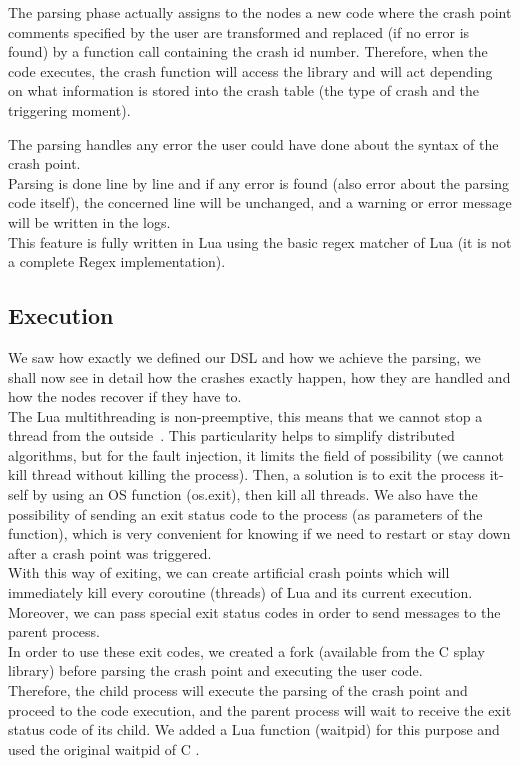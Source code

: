 \documentclass{eplmastersthesis}
\begin{document}
        The parsing phase actually assigns to the nodes a new code where the
        crash point comments specified by the user are transformed and
        replaced (if no error is found) by a function call containing the
        crash id number. Therefore, when the code executes, the crash
        function will access the library and will act depending on what
        information is stored into the crash table (the type of crash and 
        the triggering moment).

        The parsing handles any error the user could have done about the
        syntax of the crash point.\\
        Parsing is done line by line and if any error is found (also error
        about the parsing code itself), the concerned line will be unchanged, and
        a warning or error message will be written in the logs.\\
        This feature is fully written in Lua using the basic regex matcher of Lua
        \cite{RegexLua} (it is not a complete Regex implementation).

      \subsection{Execution}

        We saw how exactly we defined our DSL and how we achieve the parsing,
        we shall now see in detail how the crashes exactly happen, how they
        are handled and how the nodes recover if they have to.\\

        The Lua multithreading is non-preemptive, this means that we cannot stop a thread from the
        outside~\cite{CoroutineLua}. This particularity helps to simplify distributed algorithms,
        but for the fault injection, it limits the field of possibility 
        (we cannot kill thread without killing the process).
        Then, a solution is to exit the process it-self by using an OS function (os.exit),
        then kill all threads. We also have the possibility of sending an exit
        status code to the process (as parameters of the function),
        which is very convenient for knowing if we need to restart or stay 
        down after a crash point was triggered.\\

        With this way of exiting, we can create artificial crash points which
        will immediately kill every coroutine (threads) of Lua and its
        current execution. Moreover, we can pass special exit status codes
        in order to send messages to the parent process.\\
        In order to use these exit codes, we created a fork (available from
        the C splay library) before parsing the crash point and executing
        the user code.\\
        Therefore, the child process will execute the parsing of the crash
        point and proceed to the code execution, and the parent process will
        wait to receive the exit status code of its child. We added a Lua
        function (waitpid) for this purpose and used the original waitpid
        of C \cite{waitpid}.\\
\end{document}
